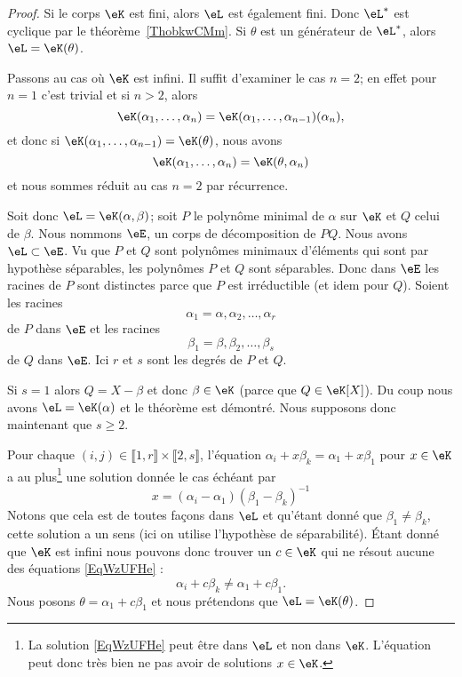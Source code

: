 \begin{proof}
	Si le corps \( \eK\) est fini, alors \( \eL\) est également fini. Donc \( \eL^*\) est cyclique par le théorème~\ref{ThobkwCMm}. Si \( \theta\) est un générateur de \( \eL^*\), alors \( \eL=\eK(\theta)\).

	Passons au cas où \( \eK\) est infini. Il suffit d'examiner le cas \( n=2\); en effet pour \( n=1\) c'est trivial et si \( n>2\), alors
	\begin{equation}
		\eK(\alpha_1,\ldots, \alpha_n)=\eK(\alpha_1,\ldots, \alpha_{n-1})(\alpha_n),
	\end{equation}
	et donc si \( \eK(\alpha_1,\ldots, \alpha_{n-1})=\eK(\theta)\), nous avons
	\begin{equation}
		\eK(\alpha_1,\ldots, \alpha_n)=\eK(\theta,\alpha_n)
	\end{equation}
	et nous sommes réduit au cas \( n=2\) par récurrence.

	Soit donc \( \eL=\eK(\alpha,\beta)\); soit \( P\) le polynôme minimal de \( \alpha\) sur \( \eK\) et \( Q\) celui de \( \beta\). Nous nommons \( \eE\), un corps de décomposition de \( PQ\). Nous avons \( \eL\subset \eE\). Vu que \( P\) et \( Q\) sont polynômes minimaux d'éléments qui sont par hypothèse séparables, les polynômes \( P\) et \( Q\) sont séparables. Donc dans \( \eE\) les racines de \( P\) sont distinctes parce que \( P\) est irréductible (et idem pour \( Q\)). Soient les racines
	\begin{equation}
		\alpha_1=\alpha,\alpha_2,\ldots, \alpha_r
	\end{equation}
	de \( P\) dans \( \eE\) et les racines
	\begin{equation}
		\beta_1=\beta,\beta_2,\ldots, \beta_s
	\end{equation}
	de \( Q\) dans \( \eE\). Ici \( r\) et \( s\) sont les degrés de \( P\) et \( Q\).

	Si \( s=1\) alors \( Q=X-\beta\) et donc \( \beta\in \eK\) (parce que \( Q\in \eK[X]\)). Du coup nous avons \( \eL=\eK(\alpha)\) et le théorème est démontré. Nous supposons donc maintenant que \( s\geq 2\).

	Pour chaque \( (i,j)\in \llbracket 1,r\rrbracket \times \llbracket 2,s\rrbracket \), l'équation \( \alpha_i+x\beta_k=\alpha_1+x\beta_1\) pour \( x\in \eK\) a au plus\footnote{La solution \eqref{EqWzUFHe} peut être dans \(  \eL\) et non dans \( \eK\). L'équation peut donc très bien ne pas avoir de solutions \( x\in \eK\).} une solution donnée le cas échéant par
	\begin{equation}    \label{EqWzUFHe}
		x=(\alpha_i-\alpha_1)(\beta_1-\beta_k)^{-1}
	\end{equation}
	Notons que cela est de toutes façons dans \( \eL\) et qu'étant donné que \( \beta_1\neq \beta_k\), cette solution a un sens (ici on utilise l'hypothèse de séparabilité). Étant donné que \( \eK\) est infini nous pouvons donc trouver un \( c\in \eK\) qui ne résout aucune des équations \eqref{EqWzUFHe} :
	\begin{equation}\label{EQooIIMVooSmvrjP}
		\alpha_i+c\beta_k\neq \alpha_1+c\beta_1.
	\end{equation}
	Nous posons \( \theta=\alpha_1+c\beta_1\) et nous prétendons que \( \eL=\eK(\theta)\).


\end{proof}

